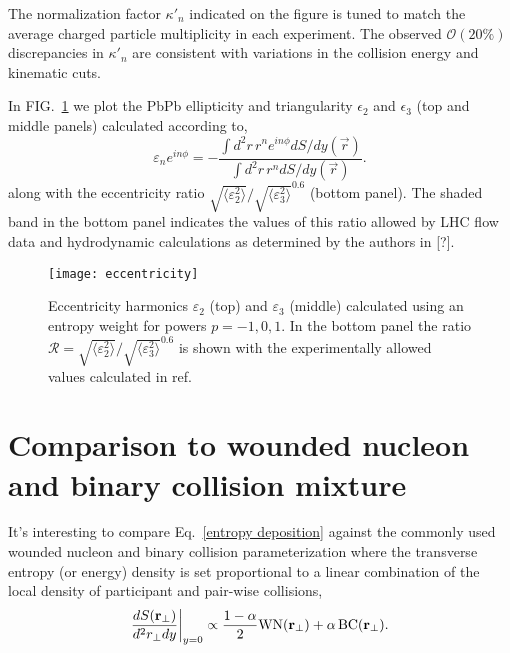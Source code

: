 \documentclass[aps,prl,reprint,amsmath,nofootinbib]{revtex4-1}
\begin{document}
The normalization factor $\kappa'_n$ indicated on the figure is tuned to match the average charged particle
multiplicity in each experiment. The observed $\mathcal{O}(20\%)$ discrepancies in $\kappa'_n$ are consistent
with variations in the collision energy and kinematic cuts.

In FIG.~\ref{fig:eccen} we plot the PbPb ellipticity and triangularity $\epsilon_2$ and $\epsilon_3$ (top
and middle panels) calculated according to,
\begin{equation}
  \varepsilon_n e^{i n\phi} = -\frac{\int d^2r\, r^n e^{i n \phi} dS/dy(\vec{r})}{\int d^2r\, r^n dS/dy(\vec{r})}.
\end{equation}
along with the eccentricity ratio $\sqrt{\langle \varepsilon_2^2 \rangle}/\sqrt{\langle \varepsilon_3^2
\rangle}^{0.6}$ (bottom panel). The shaded band in the bottom panel indicates the values of this ratio allowed
by LHC flow data and hydrodynamic calculations as determined by the authors in [?].

\begin{figure}[t]
  \texttt{[image: eccentricity]}
  \caption{\label{fig:eccen}Eccentricity harmonics $\varepsilon_2$ (top) and $\varepsilon_3$ (middle)
  calculated using an entropy weight for powers $p=-1,0,1$.  In the bottom panel the ratio $\mathcal{R} =
  \sqrt{\langle \varepsilon_2^2 \rangle}/\sqrt{\langle \varepsilon_3^2 \rangle}^{0.6}$ is shown with the
  experimentally allowed values calculated in ref.\ \cite{constraining-ic}}
\end{figure}

\section{Comparison to wounded nucleon and binary collision mixture}

It's interesting to compare Eq.~\eqref{entropy deposition} against the commonly used wounded nucleon and
binary collision parameterization where the transverse entropy (or energy) density is set proportional to a
linear combination of the local density of participant and pair-wise collisions,
\begin{equation}
  \label{glb ansatz}
  \frac{dS({\bf r}_\perp)}{d^2r_\perp dy} \biggr \rvert_{y=0} \propto
  \frac{1-\alpha}{2}\mbox{WN}({\bf r_\perp}) + \alpha\, \mbox{BC}({\bf r_\perp}).
\end{equation}
\end{document}

